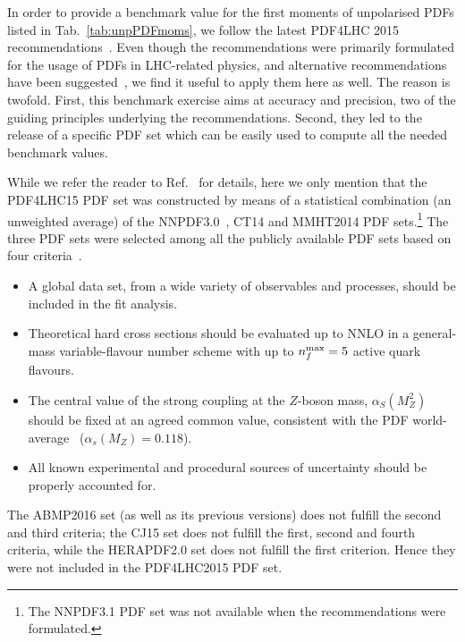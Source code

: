 In order to provide a benchmark value for the first moments of unpolarised PDFs
listed in Tab.~\ref{tab:unpPDFmoms}, we follow the latest PDF4LHC 2015 
recommendations~\cite{Butterworth:2015oua}.
%
Even though the recommendations were primarily formulated for the usage of PDFs
in LHC-related physics, and alternative recommendations have been 
suggested~\cite{Accardi:2016ndt}, we find it useful to apply them here as well.
%
The reason is twofold.
%
First, this benchmark exercise aims at accuracy and precision,  
two of the guiding principles underlying the recommendations.
%
Second, they led to the release of a specific PDF set
which can be easily used to compute all the needed benchmark values.

While we refer the reader to Ref.~\cite{Butterworth:2015oua} for details,
here we only mention that the PDF4LHC15 PDF set was constructed by means of
a statistical combination (an unweighted average) of the 
NNPDF3.0~\cite{Ball:2014uwa}, CT14 and MMHT2014 PDF sets.\footnote{The 
NNPDF3.1 PDF set was not available when the recommendations were formulated.}
%
The three PDF sets were selected among all the publicly available PDF sets
based on four criteria~\cite{Butterworth:2015oua}.
%
\begin{itemize}
%
\item A global data set, from a wide variety of observables and processes, 
should be included in the fit analysis.
%
\item Theoretical hard cross sections should be evaluated up to NNLO in a
general-mass variable-flavour number scheme with up to $n_f^{\rm max}=5$ 
active quark flavours.
%
\item The central value of the strong coupling at the $Z$-boson mass,
$\alpha_S(M_Z^2)$ should be fixed at an agreed common value, consistent 
with the PDF world-average~\cite{Olive:2016xmw} ($\alpha_s(M_Z)=0.118$).
%
\item All known experimental and procedural sources of uncertainty should be 
properly accounted for.
%
\end{itemize}
%
The ABMP2016 set (as well as its previous versions) does not fulfill the second 
and third criteria; the CJ15 set does not fulfill the first, second and fourth
criteria, while the HERAPDF2.0 set does not fulfill the first criterion.
%
Hence they were not included in the PDF4LHC2015 PDF set.

